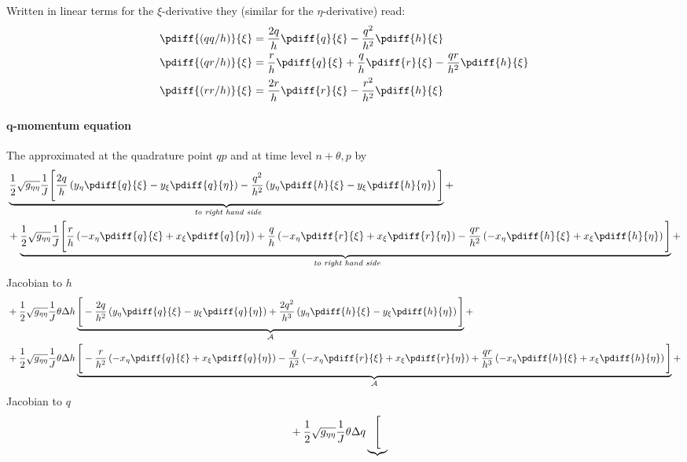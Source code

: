 Written in linear terms for the $\xi$-derivative they (similar for the $\eta$-derivative) read:
\begin{align}
    \pdiff{(qq/h)}{\xi} &= \frac{2q}{h}\pdiff{q}{\xi} -\frac{q^2}{h^2} \pdiff{h}{\xi}
    \\*
    \pdiff{(qr/h)}{\xi} &= \frac{r}{h}\pdiff{q}{\xi} + \frac{q}{h}\pdiff{r}{\xi} - \frac{qr}{h^2} \pdiff{h}{\xi}
    \\*
    \pdiff{(rr/h)}{\xi} &= \frac{2r}{h}\pdiff{r}{\xi} -\frac{r^2}{h^2} \pdiff{h}{\xi}
\end{align}
\paragraph*{$\bm q$-momentum equation}
The approximated at the quadrature point $qp$ and at time level ${n+\theta, p}$ by
{\small
\begin{align}
    & \underbrace{ \half \sqrt{g_{\eta\eta}} \Jinv \Bigg[
        \frac{2q}{h}
        \left( y_\eta \pdiff{q}{\xi} - y_\xi \pdiff{q}{\eta}  \right)
        - \frac{q^2}{h^2}
        \left(  y_\eta \pdiff{h}{\xi} - y_\xi \pdiff{h}{\eta}  \right)
        \Bigg]}_{\textit{ to right hand side}} +
    \\*
    & + \underbrace{ \half \sqrt{g_{\eta\eta}} \Jinv \Bigg[
    \frac{r}{h}
    \left( -x_\eta \pdiff{q}{\xi} + x_\xi \pdiff{q}{\eta}  \right)
    + \frac{q}{h}
    \left( -x_\eta \pdiff{r}{\xi} + x_\xi \pdiff{r}{\eta}  \right)
    - \frac{qr}{h^2}
    \left(  -x_\eta \pdiff{h}{\xi} + x_\xi \pdiff{h}{\eta}  \right)
    \Bigg]}_{\textit{ to right hand side}} +
\end{align}
Jacobian to $h$
\begin{align}
    & + \half \sqrt{g_{\eta\eta}} \Jinv \theta \Dh  \underbrace{\Bigg[
        -\frac{2q}{h^2} \left( y_\eta \pdiff{q}{\xi} - y_\xi \pdiff{q}{\eta} \right)
        + \frac{2q^2}{h^3} \left( y_\eta \pdiff{h}{\xi} - y_\xi \pdiff{h}{\eta} \right)
        \Bigg]}_{\cal A} +
    \\*
    &+\half \sqrt{g_{\eta\eta}} \Jinv \theta \Dh \underbrace{\Bigg[
        -\frac{r}{h^2}
        \left( -x_\eta \pdiff{q}{\xi} + x_\xi \pdiff{q}{\eta}  \right)
        - \frac{q}{h^2}
        \left( -x_\eta \pdiff{r}{\xi} + x_\xi \pdiff{r}{\eta}  \right)
        + \frac{qr}{h^3}
        \left(  -x_\eta \pdiff{h}{\xi} + x_\xi \pdiff{h}{\eta}  \right)
        \Bigg]}_{\cal{A}} +
\end{align}
Jacobian to $q$
\begin{align}
    & + \frac{1}{2} \sqrt{g_{\eta\eta}} \frac{1}{J} \theta \Delta q \underbrace{\Bigg[
}
\end{align}}
